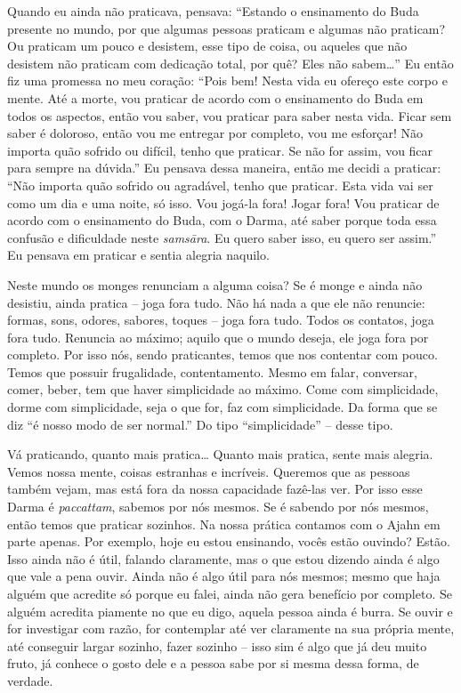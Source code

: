 Quando eu ainda não praticava, pensava: “Estando o ensinamento do
Buda presente no mundo, por que algumas pessoas praticam e algumas não
praticam? Ou praticam um pouco e desistem, esse tipo de coisa, ou
aqueles que não desistem não praticam com dedicação total, por quê?
Eles não sabem\ldots{}” Eu então fiz uma promessa no meu coração: “Pois bem!
Nesta vida eu ofereço este corpo e mente. Até a morte, vou praticar de
acordo com o ensinamento do Buda em todos os aspectos, então vou saber,
vou praticar para saber nesta vida. Ficar sem saber é doloroso, então
vou me entregar por completo, vou me esforçar! Não importa quão sofrido
ou difícil, tenho que praticar. Se não for assim, vou ficar para sempre
na dúvida.” Eu pensava dessa maneira, então me decidi a praticar: “Não
importa quão sofrido ou agradável, tenho que praticar. Esta vida vai
ser como um dia e uma noite, só isso. Vou jogá-la fora! Jogar fora! Vou
praticar de acordo com o ensinamento do Buda, com o Darma, até saber
porque toda essa confusão e dificuldade neste \textit{samsāra}. Eu
quero saber isso, eu quero ser assim.” Eu pensava em praticar e sentia
alegria naquilo. 

Neste mundo os monges renunciam a alguma coisa? Se é monge e ainda
não desistiu, ainda pratica – joga fora tudo. Não há nada a que ele não
renuncie: formas, sons, odores, sabores, toques – joga fora tudo. Todos
os contatos, joga fora tudo. Renuncia ao máximo; aquilo que o mundo
deseja, ele joga fora por completo. Por isso nós, sendo praticantes,
temos que nos contentar com pouco. Temos que possuir frugalidade,
contentamento. Mesmo em falar, conversar, comer, beber, tem que haver
simplicidade ao máximo. Come com simplicidade, dorme com simplicidade,
seja o que for, faz com simplicidade. Da forma que se diz “é nosso modo
de ser normal.” Do tipo “simplicidade” – desse tipo. 

Vá praticando, quanto mais pratica\ldots{} Quanto mais pratica, sente mais
alegria. Vemos nossa mente, coisas estranhas e incríveis. Queremos que
as pessoas também vejam, mas está fora da nossa capacidade fazê-las
ver. Por isso esse Darma é \textit{paccattam}, sabemos por nós mesmos.
Se é sabendo por nós mesmos, então temos que praticar sozinhos. Na
nossa prática contamos com o Ajahn em parte apenas. Por exemplo, hoje
eu estou ensinando, vocês estão ouvindo? Estão. Isso ainda não é útil,
falando claramente, mas o que estou dizendo ainda é algo que vale a
pena ouvir. Ainda não é algo útil para nós mesmos; mesmo que haja
alguém que acredite só porque eu falei, ainda não gera benefício por
completo. Se alguém acredita piamente no que eu digo, aquela pessoa
ainda é burra. Se ouvir e for investigar com razão, for contemplar até
ver claramente na sua própria mente, até conseguir largar sozinho,
fazer sozinho – isso sim é algo que já deu muito fruto, já conhece o
gosto dele e a pessoa sabe por si mesma dessa forma, de verdade. 

